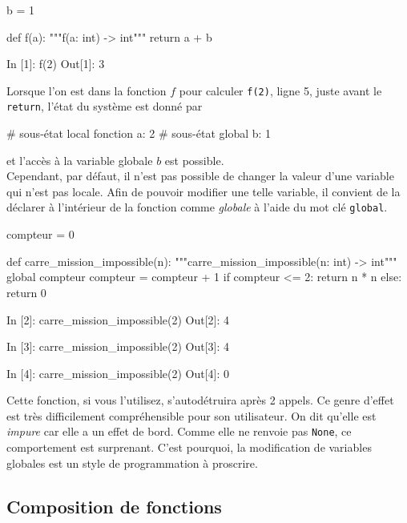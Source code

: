 \documentclass{magnolia}
\begin{document}
\begin{pythoncodeline}
b = 1

def f(a):
    """f(a: int) -> int"""
    return a + b
\end{pythoncodeline}

\begin{pythoncode}
In [1]: f(2)
Out[1]: 3  
\end{pythoncode}

\noindent Lorsque l'on est dans la fonction $f$
pour calculer \verb_f(2)_, ligne 5, juste avant le \verb_return_, l'état du système est donné par
\begin{pythoncode}
# sous-état local fonction  {a: 2}
# sous-état global                 {b: 1}
\end{pythoncode}
\noindent et l'accès à la variable globale $b$ est possible.\\

Cependant, par défaut, il n'est pas possible de changer la valeur d'une variable
qui n'est pas locale. Afin de pouvoir modifier une telle variable, il convient de la
déclarer à l'intérieur de la fonction comme \emph{globale} à l'aide du mot clé
\verb_global_.

\begin{pythoncodeline}
compteur = 0

def carre_mission_impossible(n):
    """carre_mission_impossible(n: int) -> int"""
    global compteur
    compteur = compteur + 1
    if compteur <= 2:
        return n * n
    else:
        return 0
\end{pythoncodeline}

\begin{pythoncode}
In [2]: carre_mission_impossible(2)
Out[2]: 4

In [3]: carre_mission_impossible(2)
Out[3]: 4

In [4]: carre_mission_impossible(2)
Out[4]: 0
\end{pythoncode}

\noindent Cette fonction, si vous l'utilisez, s'autodétruira après 2 appels.
Ce genre d'effet est très
difficilement compréhensible pour son utilisateur. On dit qu'elle est \emph{impure} car elle a un effet de bord. Comme elle ne renvoie pas
\verb!None!, ce comportement est surprenant.
C'est pourquoi, la modification de variables globales est un style de programmation à
proscrire.


\subsection{Composition de fonctions}
\end{document}
